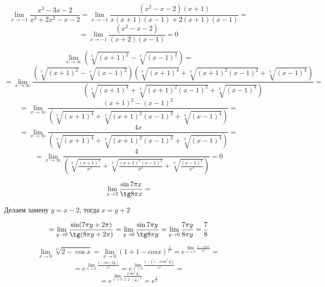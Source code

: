 \documentclass[a4paper,16pt]{article}
\begin{document}

\[
\lim_{x \to -1}\frac{x^3-3x-2}{x^3+2x^2-x-2}=
\lim_{x \to -1}\frac{(x^2-x-2)(x+1)}{x(x+1)(x-1)+2(x+1)(x-1)}=
\]
\[=
\lim_{x \to -1}\frac{(x^2-x-2)}{(x+2)(x-1)}=0
\]

\[
\lim_{x \to \infty}\left({ \sqrt[3]{(x+1)^2}-\sqrt[3]{(x-1)^2} }\right)=
\]
\[=
\lim_{x \to \infty}\frac{\left(\sqrt[3]{(x+1)^2}-\sqrt[3]{(x-1)^2}\right)  \left(\sqrt[3]{(x+1)^4}+\sqrt[3]{(x+1)^2 (x-1)^2}+\sqrt[3]{(x-1)^4}\right)}{\left(\sqrt[3]{(x+1)^4}+\sqrt[3]{(x+1)^2 (x-1)^2}+\sqrt[3]{(x-1)^4}\right)}=
\]
\[=
\lim_{x \to \infty}\frac{(x+1)^2-(x-1)^2}{\left(\sqrt[3]{(x+1)^4}+\sqrt[3]{(x+1)^2 (x-1)^2}+\sqrt[3]{(x-1)^4}\right)}=
\]
\[=
\lim_{x \to \infty}\frac{4x}{\left(\sqrt[3]{(x+1)^4}+\sqrt[3]{(x+1)^2 (x-1)^2}+\sqrt[3]{(x-1)^4}\right)}=
\]
\[=
\lim_{x \to \infty}\frac{4}{\left(\sqrt[3]{\frac{(x+1)^4}{x^3}}+\sqrt[3]{\frac{(x+1)^2 (x-1)^2}{x^3}}+\sqrt[3]{\frac{(x-1)^4}{x^3}}\right)}=0
\]


\[
\lim_{x \to 2}\frac{\sin 7 \pi x}{\tg 8 \pi x}=
\]

Делаем замену $y=x-2$, тогда $x=y+2$

\[
=
\lim_{y \to 0}\frac{\sin (7 \pi y + 2 \pi)}{\tg (8 \pi y+ 2 \pi)}=
\lim_{y \to 0}\frac{\sin 7 \pi y }{\tg 8 \pi y}=
\lim_{y \to 0}\frac{7 \pi y }{8 \pi y}=
\frac{7}{8}
\]

\[
\lim_{x \to 0}\sqrt[x^2]{2-\cos x}=\lim_{x \to 0}(1+1-cosx)^{\frac{1}{x^2}}=
e^{\lim_{x \to 0} \frac{1-cos x}{x^2}}=
\]
\[=
e^{\lim_{x \to 0} \frac{1-cos \left(2\frac{x}{2}\right)}{x^2}}=
e^{\lim_{x \to 0} \frac{1-\left(1-2 \sin^2\frac{x}{2}\right)}{x^2}}=
\]
 \[=
e^{\lim_{x \to 0} \frac{2 \sin^2\frac{x}{2}}{2 \cdot 2 \cdot \left(\frac{x}{2}\right)^2}}=e^{\frac{1}{2}}
 \]
\end{document}
